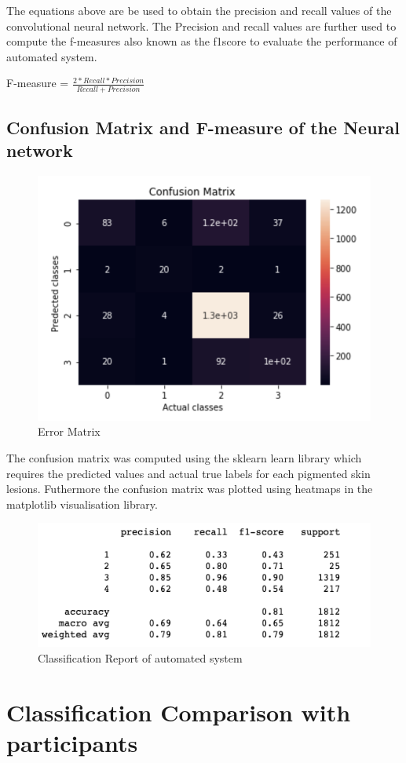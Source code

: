 The equations above are be used to obtain the precision and recall values of the 
convolutional neural network. The Precision and recall values are further used 
to compute the f-measures also known as the f1score to evaluate the performance of 
automated system. \\ 
\begin{center}
    F-measure = ${\frac{2 * Recall * Precision}{Recall + Precision}}$
\end{center}

\subsection{Confusion Matrix and F-measure of the Neural network}
\begin{figure}[!htp]
    \includegraphics[width=\textwidth]{Images/cma.png}
    \caption{Error Matrix}
    \label{fig:ErrorMatrix}
\end{figure}

The confusion matrix was computed using the sklearn learn library which requires the predicted values and 
actual true labels for each pigmented skin lesions. Futhermore the confusion matrix  was plotted using heatmaps
in the matplotlib visualisation library.
\pagebreak

\begin{figure}[!htp]
    \includegraphics[width=\textwidth]{Images/f11.png}
    \caption{Classification Report of automated system}
    \label{fig:f11}
\end{figure}

\pagebreak

\section{Classification Comparison with participants}